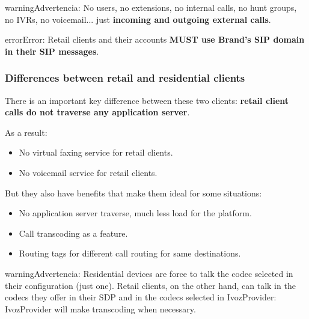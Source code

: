 \documentclass[letterpaper,10pt,spanish]{sphinxmanual}
\begin{document}
\begin{notice}{warning}{Advertencia:}
No users, no extensions, no internal calls, no hunt groups, no IVRs, no voicemail...
just \textbf{incoming and outgoing external calls}.
\end{notice}

\begin{notice}{error}{Error:}
Retail clients and their accounts \textbf{MUST use Brand's SIP domain in their SIP messages}.
\end{notice}


\subsubsection{Differences between retail and residential clients}
\label{administration_portal/brand/clients/retail:differences-between-retail-and-residential-clients}\label{administration_portal/brand/clients/retail:id1}
There is an important key difference between these two clients: \textbf{retail client calls do not traverse
any application server}.

As a result:
\begin{itemize}
\item {} 
No virtual faxing service for retail clients.

\item {} 
No voicemail service for retail clients.

\end{itemize}

But they also have benefits that make them ideal for some situations:
\begin{itemize}
\item {} 
No application server traverse, much less load for the platform.

\item {} 
Call transcoding as a feature.

\item {} 
Routing tags for different call routing for same destinations.

\end{itemize}

\begin{notice}{warning}{Advertencia:}
Residential devices are force to talk the codec selected in their configuration (just one).
Retail clients, on the other hand, can talk in the codecs they offer in their SDP and in the
codecs selected in IvozProvider: IvozProvider will make transcoding when necessary.
\end{notice}
\end{document}
